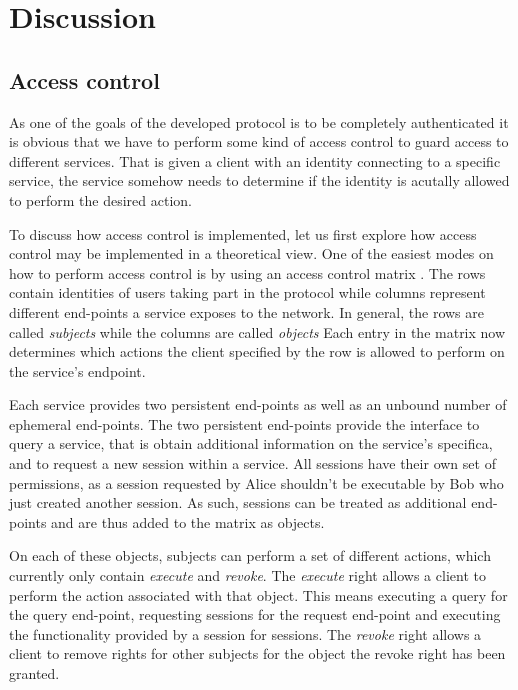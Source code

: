 \section{Discussion}

\subsection{Access control}

As one of the goals of the developed protocol is to be completely authenticated it is obvious that we have to perform some kind of access control to guard access to different services.
That is given a client with an identity connecting to a specific service, the service somehow needs to determine if the identity is acutally allowed to perform the desired action.

To discuss how access control is implemented, let us first explore how access control may be implemented in a theoretical view.
One of the easiest modes on how to perform access control is by using an access control matrix \cite{lampson1974protection,tanenbaum2014modern}.
The rows contain identities of users taking part in the protocol while columns represent different end-points a service exposes to the network.
In general, the rows are called \emph{subjects} while the columns are called \emph{objects}
Each entry in the matrix now determines which actions the client specified by the row is allowed to perform on the service's endpoint.

Each service provides two persistent end-points as well as an unbound number of ephemeral end-points.
The two persistent end-points provide the interface to query a service, that is obtain additional information on the service's specifica, and to request a new session within a service.
All sessions have their own set of permissions, as a session requested by Alice shouldn't be executable by Bob who just created another session.
As such, sessions can be treated as additional end-points and are thus added to the matrix as objects.

On each of these objects, subjects can perform a set of different actions, which currently only contain \emph{execute} and \emph{revoke}.
The \emph{execute} right allows a client to perform the action associated with that object.
This means executing a query for the query end-point, requesting sessions for the request end-point and executing the functionality provided by a session for sessions.
The \emph{revoke} right allows a client to remove rights for other subjects for the object the revoke right has been granted.

